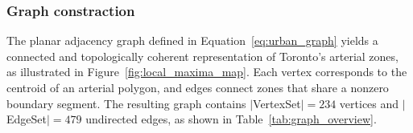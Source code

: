 \subsubsection{Graph constraction}
\label{subsec:hop_distance_results}

The planar adjacency graph defined in Equation~\eqref{eq:urban_graph} yields a connected and topologically coherent representation of Toronto's arterial zones, as illustrated in Figure~\ref{fig:local_maxima_map}. 
Each vertex corresponds to the centroid of an arterial polygon, and edges connect zones that share a nonzero boundary segment. 
The resulting graph contains $|$\gls{VertexSet}$| = 234$ vertices and $|$\gls{EdgeSet}$| = 479$ undirected edges, as shown in Table~\ref{tab:graph_overview}.

